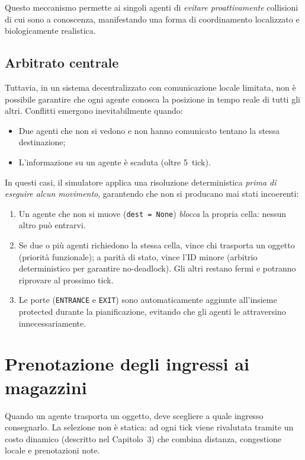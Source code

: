 Questo meccanismo permette ai singoli agenti di \emph{evitare proattivamente} collisioni
di cui sono a conoscenza, manifestando una forma di coordinamento localizzato e
biologicamente realistica.

\subsection*{Arbitrato centrale}

Tuttavia, in un sistema decentralizzato con comunicazione locale limitata, non è possibile
garantire che ogni agente conosca la posizione in tempo reale di tutti gli altri. Conflitti
emergono inevitabilmente quando:

\begin{itemize}
  \item Due agenti che non si vedono e non hanno comunicato tentano la stessa destinazione;
  \item L'informazione su un agente è scaduta (oltre 5~tick).
\end{itemize}

In questi casi, il simulatore applica una risoluzione deterministica \emph{prima di eseguire
alcun movimento}, garantendo che non si producano mai stati incoerenti:

\begin{enumerate}
  \item Un agente che non si muove (\texttt{dest\,=\,None}) \emph{blocca} la propria cella:
        nessun altro può entrarvi.
  \item Se due o più agenti richiedono la stessa cella, vince chi trasporta un oggetto
        (priorità funzionale); a parità di stato, vince l'ID minore (arbitrio deterministico
        per garantire no-deadlock).
        Gli altri restano fermi e potranno riprovare al prossimo tick.
  \item Le porte (\texttt{ENTRANCE} e \texttt{EXIT}) sono automaticamente aggiunte
        all'insieme protected durante la pianificazione, evitando che gli agenti le attraversino
        innecessariamente.
\end{enumerate}

\section{Prenotazione degli ingressi ai magazzini}

Quando un agente trasporta un oggetto, deve scegliere a quale ingresso consegnarlo.
La selezione non \`e statica: ad ogni tick viene rivalutata tramite un costo dinamico
(descritto nel Capitolo~3) che combina distanza, congestione locale e prenotazioni note.

